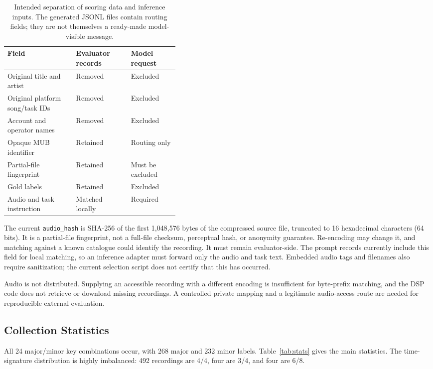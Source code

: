 \documentclass[11pt,a4paper]{article}
\begin{document}
\begin{table}[tbp]
\centering\small
\begin{tabularx}{\linewidth}{@{}p{0.40\linewidth}XX@{}}
\toprule
Field & Evaluator records & Model request \\
\midrule
Original title and artist & Removed & Excluded \\
Original platform song/task IDs & Removed & Excluded \\
Account and operator names & Removed & Excluded \\
Opaque MUB identifier & Retained & Routing only \\
Partial-file fingerprint & Retained & Must be excluded \\
Gold labels & Retained & Excluded \\
Audio and task instruction & Matched locally & Required \\
\bottomrule
\end{tabularx}
\caption{Intended separation of scoring data and inference inputs. The generated JSONL files contain routing fields; they are not themselves a ready-made model-visible message.}
\label{tab:anonymization}
\end{table}

The current \texttt{audio\_hash} is SHA-256 of the first 1,048,576 bytes of the compressed source file, truncated to 16 hexadecimal characters (64 bits). It is a partial-file fingerprint, not a full-file checksum, perceptual hash, or anonymity guarantee. Re-encoding may change it, and matching against a known catalogue could identify the recording. It must remain evaluator-side. The prompt records currently include this field for local matching, so an inference adapter must forward only the audio and task text. Embedded audio tags and filenames also require sanitization; the current selection script does not certify that this has occurred.

Audio is not distributed. Supplying an accessible recording with a different encoding is insufficient for byte-prefix matching, and the DSP code does not retrieve or download missing recordings. A controlled private mapping and a legitimate audio-access route are needed for reproducible external evaluation.

\subsection{Collection Statistics}
All 24 major/minor key combinations occur, with 268 major and 232 minor labels. Table~\ref{tab:stats} gives the main statistics. The time-signature distribution is highly imbalanced: 492 recordings are 4/4, four are 3/4, and four are 6/8.
\end{document}
